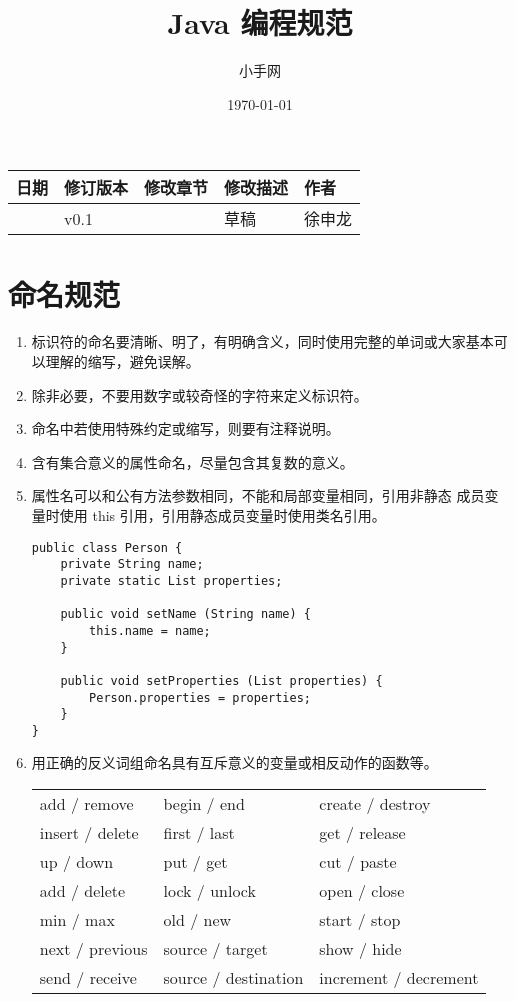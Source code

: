 \documentclass[a4paper,12pt]{article}
\author{小手网}
\title{Java 编程规范}
\date{\today}
\makeatletter
\newcommand{\tabcaption}{\def\@captype{table}\caption}
\makeatother
\begin{document}
\maketitle
\begin{multicols}{2}
\tableofcontents
\lstlistoflistings
\end{multicols}

\tabcaption{修改记录}
\begin{tabular}{|p{}|p{}|p{}
    |p{}|p{}|}\hline
    日期 & 修订版本 & 修改章节 & 修改描述 & 作者\\\hline
    & v0.1 & & 草稿 & 徐申龙 \\\hline
\end{tabular}

\section{命名规范}
\begin{enumerate} 
    \item 标识符的命名要清晰、明了，有明确含义，同时使用完整的单词或大家基本可以理解的缩写，避免误解。
    \item 除非必要，不要用数字或较奇怪的字符来定义标识符。
    \item 命名中若使用特殊约定或缩写，则要有注释说明。
    \item 含有集合意义的属性命名，尽量包含其复数的意义。
    \item 属性名可以和公有方法参数相同，不能和局部变量相同，引用非静态
        成员变量时使用 this 引用，引用静态成员变量时使用类名引用。
\begin{lstlisting}
public class Person {
    private String name;
    private static List properties;

    public void setName (String name) {
        this.name = name;
    }

    public void setProperties (List properties) {
        Person.properties = properties;
    }
}
\end{lstlisting}
    \item 用正确的反义词组命名具有互斥意义的变量或相反动作的函数等。
        \tabcaption{ 常见的反义词 }
        \begin{tabular}{lll} 
            add / remove    & begin / end      & create / destroy \\
            insert / delete & first / last     & get / release \\
            up / down       & put / get        & cut / paste \\
            add / delete    & lock / unlock    & open / close \\
            min / max       & old / new        & start / stop \\
            next / previous & source / target  & show / hide \\
            send / receive  & source / destination  & increment / decrement
        \end{tabular}
\end{enumerate}
\end{document}
